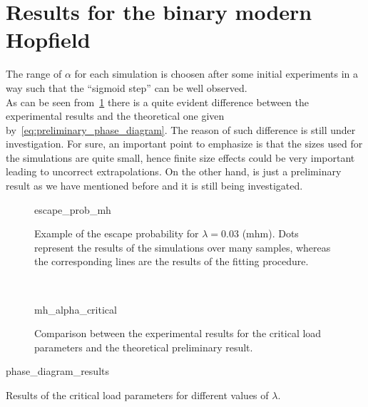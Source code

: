\documentclass[\rootdir/main.tex]{subfiles}
\begin{document}
\clearpage
\section{Results for the binary modern Hopfield}
The range of $\alpha$ for each simulation is choosen after some initial experiments in a way such that the ``sigmoid step'' can be well observed.\\
As can be seen from~\cref{fig:mh:alpha_critical} there is a quite evident difference between the experimental results and the theoretical one given by~\cref{eq:preliminary_phase_diagram}. The reason of such difference is still under investigation. For sure, an important point to emphasize is that the sizes used for the simulations are quite small, hence finite size effects could be very important leading to uncorrect extrapolations. On the other hand,  is just a preliminary result as we have mentioned before and it is still being investigated.
\begin{figure}[h]
    \centering
    {escape_prob_mh}
    \caption{Example of the escape probability for $\lambda = 0.03$ (\acrlong{mhm}). Dots represent the results of the simulations over many samples, whereas the corresponding lines are the results of the fitting procedure.}
\end{figure}\\
\begin{figure}
    \centering
    {mh_alpha_critical}
    \caption{Comparison between the experimental results for the critical load parameters and the theoretical preliminary result.}
    \label{fig:mh:alpha_critical}
\end{figure}
\begin{table}[hbt]
    \centering
    {phase_diagram_results}
    \caption{Results of the critical load parameters for different values of $\lambda$.}
\end{table}

\subbibliography
\end{document}
